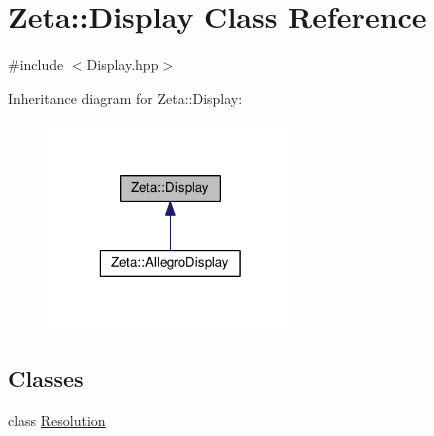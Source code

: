 \hypertarget{classZeta_1_1Display}{\section{Zeta\+:\+:Display Class Reference}
\label{classZeta_1_1Display}
}


{\ttfamily \#include $<$Display.\+hpp$>$}



Inheritance diagram for Zeta\+:\+:Display\+:\nopagebreak
\begin{figure}[H]
\begin{center}
\leavevmode
\includegraphics[width=184pt]{classZeta_1_1Display__inherit__graph}
\end{center}
\end{figure}
\subsection*{Classes}
\begin{DoxyCompactItemize}
\item 
class \hyperlink{classZeta_1_1Display_1_1Resolution}{Resolution}
\end{DoxyCompactItemize}
